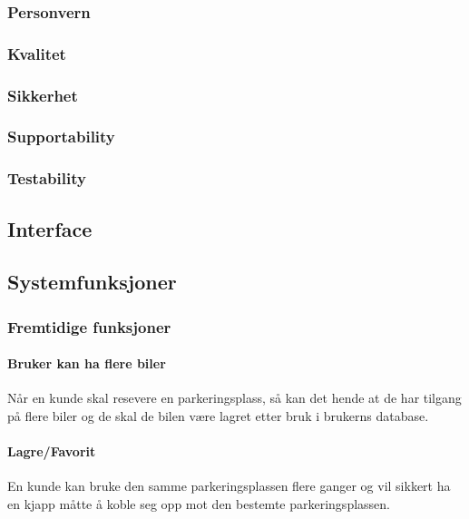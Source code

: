 \documentclass[12pt]{article}
\begin{document}
        \subsubsection{Personvern}


        \subsubsection{Kvalitet}


        \subsubsection{Sikkerhet}


        \subsubsection{Supportability}


        \subsubsection{Testability}
        

    \subsection{Interface}

    \subsection{Systemfunksjoner}

        \subsubsection{Fremtidige funksjoner}

            \paragraph{Bruker kan ha flere biler}
            Når en kunde skal resevere en parkeringsplass, så kan det hende at de har tilgang på flere biler og de skal de bilen være lagret etter bruk i brukerns database.

            \paragraph{Lagre/Favorit}
            En kunde kan bruke den samme parkeringsplassen flere ganger og vil sikkert ha en kjapp måtte å koble seg opp mot den bestemte parkeringsplassen.
\end{document}
